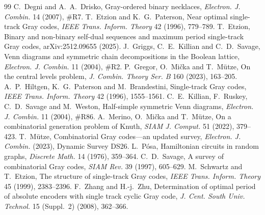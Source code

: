 \documentclass[11pt]{article}
\begin{document}
\begin{thebibliography}{99}
 C.~Degni and A.~A.~Drisko, Gray-ordered binary necklaces, \emph{Electron. J. Combin.} 14 (2007),
\#R7.
 T.~Etzion and K.~G.~Paterson, Near optimal single-track Gray codes, \emph{IEEE Trans. Inform. Theory}
42 (1996), 779--789.
 T.~Etzion, Binary and non-binary self-dual sequences and maximum period single-track Gray codes,
arXiv:2512.09655 (2025).
 J.~Griggs, C.~E.~Killian and C.~D.~Savage, Venn diagrams and symmetric chain decompositions in the
Boolean lattice, \emph{Electron. J. Combin.} 11 (2004), \#R2.
 P.~Gregor, O.~Mi\v{c}ka and T.~M\"utze, On the central levels problem, \emph{J. Combin. Theory Ser. B} 160
(2023), 163--205.
 A.~P.~Hiltgen, K.~G.~Paterson and M.~Brandestini, Single-track Gray codes, \emph{IEEE Trans. Inform.
Theory} 42 (1996), 1555--1561.
 C.~E.~Killian, F.~Ruskey, C.~D.~Savage and M.~Weston, Half-simple symmetric Venn diagrams,
\emph{Electron. J. Combin.} 11 (2004), \#R86.
 A.~Merino, O.~Mi\v{c}ka and T.~M\"utze, On a combinatorial generation problem of Knuth, \emph{SIAM J. Comput.}
51 (2022), 379--423.
 T.~M\"utze, Combinatorial Gray codes---an updated survey, \emph{Electron. J. Combin.} (2023), Dynamic
Survey DS26.
 L.~P\'osa, Hamiltonian circuits in random graphs, \emph{Discrete Math.} 14 (1976), 359--364.
 C.~D.~Savage, A survey of combinatorial Gray codes, \emph{SIAM Rev.} 39 (1997), 605--629.
 M.~Schwartz and T.~Etzion, The structure of single-track Gray codes, \emph{IEEE Trans. Inform. Theory}
45 (1999), 2383--2396.
 F.~Zhang and H.-j.~Zhu, Determination of optimal period of absolute encoders with single track cyclic
Gray code, \emph{J. Cent. South Univ. Technol.} 15 (Suppl.~2) (2008), 362--366.
\end{thebibliography}
\end{document}
